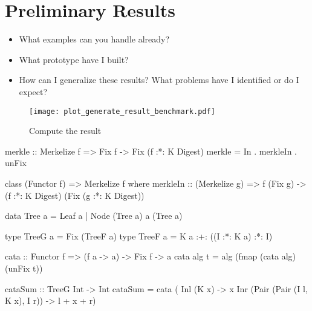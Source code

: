 \section{Preliminary Results}
\begin{itemize}
    \item What examples can you handle already?
    \item What prototype have I built?
    \item How can I generalize these results? What problems have I identified or do I expect?
\end{itemize}

\begin{figure}[H]
  \centering

  \texttt{[image: plot\_generate\_result\_benchmark.pdf]}
  \caption{Compute the result}
  \label{fig-compute-result}
\end{figure}


\begin{haskell}
merkle :: Merkelize f => Fix f -> Fix (f :*: K Digest)
merkle = In . merkleIn . unFix
\end{haskell}

\begin{haskell}
class (Functor f) => Merkelize f where
  merkleIn :: (Merkelize g) 
           => f (Fix g) -> (f :*: K Digest) (Fix (g :*: K Digest))
\end{haskell}

\begin{haskell}
data Tree a = Leaf a
            | Node (Tree a) a (Tree a)

type TreeG a = Fix (TreeF a)
type TreeF a = K a
            :+: ((I :*: K a) :*: I)
\end{haskell}

\begin{haskell}
cata :: Functor f => (f a -> a) -> Fix f -> a
cata alg t = alg (fmap (cata alg) (unFix t)) 
\end{haskell}

\begin{haskell}
cataSum :: TreeG Int -> Int
cataSum = cata (\case
  Inl (K x)                         -> x
  Inr (Pair (Pair (I l, K x), I r)) -> l + x + r)
\end{haskell}